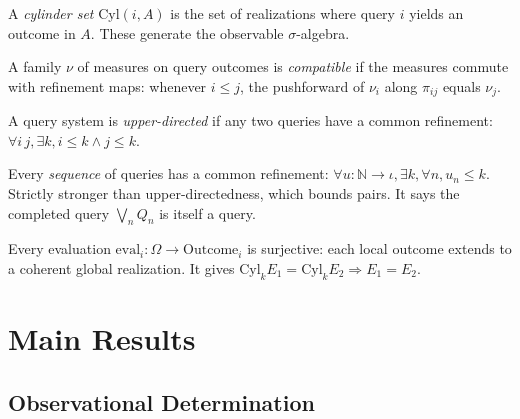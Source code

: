\begin{definition}
\label{def:cylinder}
\leanok
A \emph{cylinder set} $\text{Cyl}(i, A)$ is the set of realizations where query $i$ yields an outcome in $A$.
These generate the observable $\sigma$-algebra.
\end{definition}

\begin{definition}
\label{def:compatible-marginals}
\leanok
{}
A family $\nu$ of measures on query outcomes is \emph{compatible} if the measures commute with refinement maps:
whenever $i \le j$, the pushforward of $\nu_i$ along $\pi_{ij}$ equals $\nu_j$.
\end{definition}

\begin{definition}
\label{def:upper-directed}
\leanok
A query system is \emph{upper-directed} if any two queries have a common
refinement: $\forall i\,j, \exists k, i \le k \land j \le k$.
\end{definition}

\begin{definition}
\label{def:seq-upper-directed}
\leanok
{}
Every \emph{sequence} of queries has a common refinement:
$\forall u : \mathbb{N} \to \iota, \exists k, \forall n, u_n \le k$. Strictly
stronger than upper-directedness, which bounds pairs. It says the completed
query $\bigvee_n Q_n$ is itself a query.
\end{definition}

\begin{definition}
\label{def:eval-surjective}
\leanok
{}
  Every evaluation $\mathrm{eval}_i : \Omega \to \mathrm{Outcome}_i$ is
surjective: each local outcome extends to a coherent global realization. It
gives $\mathrm{Cyl}_k E_1 = \mathrm{Cyl}_k E_2 \Rightarrow E_1 = E_2$.
\end{definition}

\section{Main Results}

\subsection{Observational Determination}

